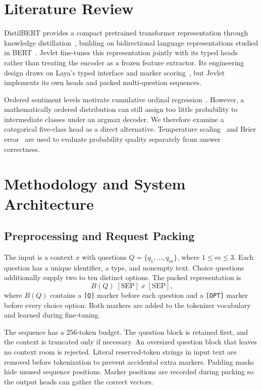 \documentclass[conference]{IEEEtran}
\begin{document}
\section{Literature Review}
DistilBERT provides a compact pretrained transformer representation through knowledge distillation~\cite{distilbert}, building on bidirectional language representations studied in BERT~\cite{bert}. Jevlet fine-tunes this representation jointly with its typed heads rather than treating the encoder as a frozen feature extractor. Its engineering design draws on Laya's typed interface and marker scoring~\cite{laya}, but Jevlet implements its own heads and packed multi-question sequences.

Ordered sentiment levels motivate cumulative ordinal regression~\cite{coral}. However, a mathematically ordered distribution can still assign too little probability to intermediate classes under an argmax decoder. We therefore examine a categorical five-class head as a direct alternative. Temperature scaling~\cite{guo} and Brier error~\cite{brier} are used to evaluate probability quality separately from answer correctness.

\section{Methodology and System Architecture}
\subsection{Preprocessing and Request Packing}
The input is a context $x$ with questions $Q=\{q_1,\ldots,q_m\}$, where $1\leq m\leq3$. Each question has a unique identifier, a type, and nonempty text. Choice questions additionally supply two to ten distinct options. The packed representation is
\begin{equation}
[\mathrm{CLS}]\;B(Q)\;[\mathrm{SEP}]\;x\;[\mathrm{SEP}],
\end{equation}
where $B(Q)$ contains a \texttt{[Q]} marker before each question and a \texttt{[OPT]} marker before every choice option. Both markers are added to the tokenizer vocabulary and learned during fine-tuning.

The sequence has a 256-token budget. The question block is retained first, and the context is truncated only if necessary. An oversized question block that leaves no context room is rejected. Literal reserved-token strings in input text are removed before tokenization to prevent accidental extra markers. Padding masks hide unused sequence positions. Marker positions are recorded during packing so the output heads can gather the correct vectors.
\end{document}
